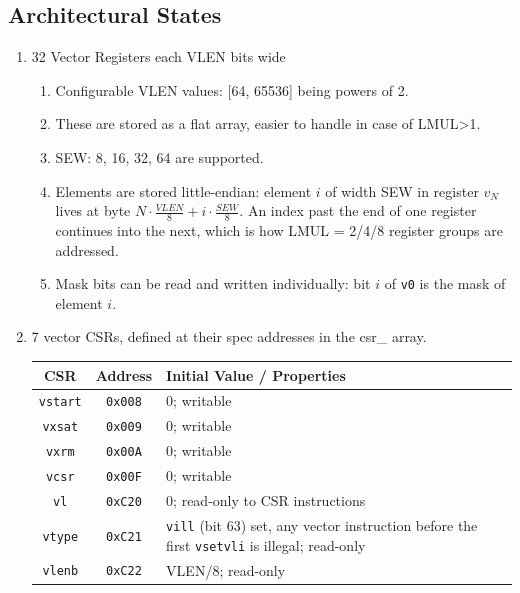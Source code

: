 \documentclass{article}
\begin{document}
\subsection{Architectural States}
\begin{enumerate}
    \item 32 Vector Registers each VLEN bits wide
    \begin{enumerate}
        \item Configurable VLEN values: [64, 65536] being powers of 2.
        \item These are stored as a flat array, easier to handle in case of LMUL>1.
        \item SEW: {8, 16, 32, 64} are supported.
        \item Elements are stored little-endian: element $i$ of width SEW in register $v_N$ lives at
        byte $N \cdot \frac{VLEN}{8} + i \cdot \frac{SEW}{8}$. An index past the end of one register
        continues into the next, which is how LMUL = 2/4/8 register groups are addressed.
        \item Mask bits can be read and written individually: bit $i$ of \texttt{v0} is the mask
        of element $i$.
    \end{enumerate}
    \item 7 vector CSRs, defined at their spec addresses in the csr\_ array.
    \begin{table}[h]
    \centering
    \begin{tabular}{|c|c|p{9cm}|}
        \hline
        \textbf{CSR} & \textbf{Address} & \textbf{Initial Value / Properties} \\
        \hline
        \texttt{vstart} & \texttt{0x008} & 0; writable \\
        \hline
        \texttt{vxsat}  & \texttt{0x009} & 0; writable \\
        \hline
        \texttt{vxrm}   & \texttt{0x00A} & 0; writable \\
        \hline
        \texttt{vcsr}   & \texttt{0x00F} & 0; writable \\
        \hline
        \texttt{vl}     & \texttt{0xC20} & 0; read-only to CSR instructions \\
        \hline
        \texttt{vtype}  & \texttt{0xC21} & \texttt{vill} (bit 63) set, any vector instruction before the first \texttt{vsetvli} is illegal; read-only \\
        \hline
        \texttt{vlenb}  & \texttt{0xC22} & VLEN/8; read-only \\
        \hline

\end{tabular}
\end{table}
\end{enumerate}
\end{document}
